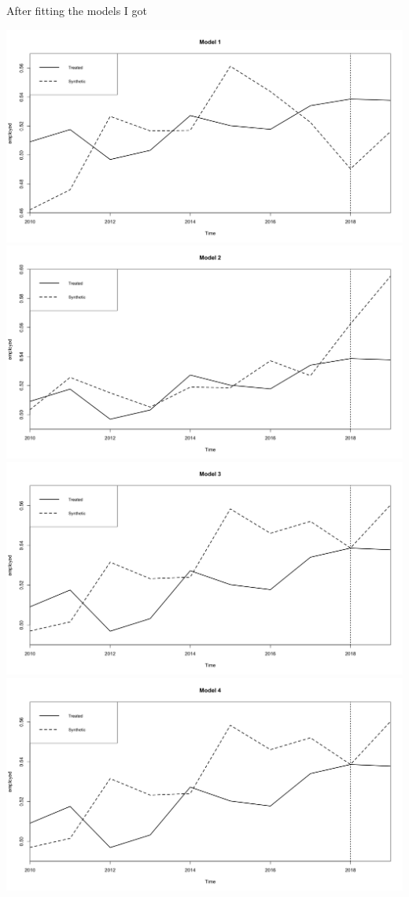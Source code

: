 \documentclass{article}
\begin{document}
	After fitting the models I got
	\begin{center}
		\includegraphics[scale = 0.15]{model1}
		\includegraphics[scale = 0.15]{model2}
		\includegraphics[scale = 0.15]{model3}
		\includegraphics[scale = 0.15]{model4}
	\end{center}
\end{document}
